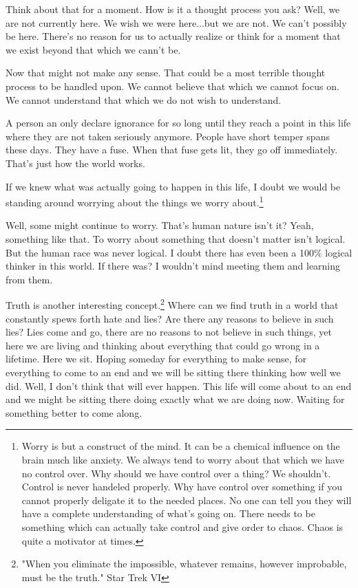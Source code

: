 {Think about that for a moment. How is it a thought process you ask? Well, we are
not currently here. We wish we were here...but we are not. We can't possibly be
here. There's no reason for us to actually realize or think for a moment that we
exist beyond that which we cann't be.

Now that might not make any sense. That could be a most terrible thought process
to be handled upon. We cannot believe that which we cannot focus on. We cannot
understand that which we do not wish to understand.

A person an only declare ignorance for so long until they reach a point in this
life where they are not taken seriously anymore. People have short temper spans
these days. They have a fuse. When that fuse gets lit, they go off immediately.
That's just how the world works.
}

If we knew what was actually going to happen in this life, I doubt we would be
standing around worrying about the things we worry about.\footnote{
Worry is but a construct of the mind. It can be a chemical influence on the
brain much like anxiety. We always tend to worry about that which we have no
control over. Why should we have control over a thing? We shouldn't. Control is
never handeled properly. Why have control over something if you cannot properly
deligate it to the needed places. No one can tell you they will have a complete
understanding of what's going on. There needs to be something which can actually
take control and give order to chaos. Chaos is quite a motivator at times.
}

Well, some might continue to worry. That's human nature isn't it? Yeah, something 
like that. To worry about something that doesn't matter isn't logical. But the 
human race was never logical. I doubt there has even been a 100\% logical 
thinker in this world. If there was? I wouldn't mind meeting them and learning 
from them.

Truth is another interesting concept.\footnote{"When you eliminate the impossible, 
whatever remains, however improbable, must be the truth." Star Trek VI} Where
can we find truth in a world that constantly spews forth hate and lies? Are
there any reasons to believe in such lies? Lies come and go, there are no
reasons to not believe in such things, yet here we are living and thinking about
everything that could go wrong in a lifetime. Here we sit. Hoping someday for
everything to make sense, for everything to come to an end and we will be
sitting there thinking how well we did. Well, I don't think that will ever
happen. This life will come about to an end and we might be sitting there doing
exactly what we are doing now. Waiting for something better to come along.